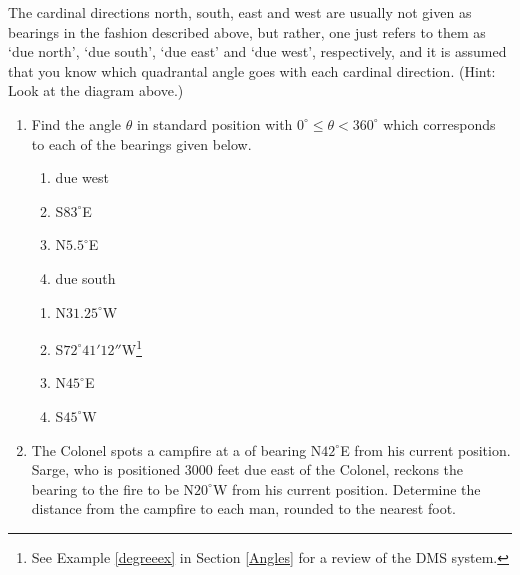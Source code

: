The cardinal directions north, south, east and west are usually not given as bearings in the fashion described above, but rather, one just refers to them as `due north', `due south', `due east' and `due west', respectively, and it is assumed that you know which quadrantal angle goes with each cardinal direction.  (Hint: Look at the diagram above.)  

\begin{enumerate}

\setcounter{enumi}{\value{HW}}

\item Find the angle $\theta$ in standard position with $0^{\circ} \leq \theta < 360^{\circ}$ which corresponds to each of the bearings given below.
\enlargethispage{.25in}
\begin{multicols}{4}

\begin{enumerate}

\item due west
\item S$83^{\circ}$E
\item N$5.5^{\circ}$E
\item due south

\setcounter{HWindent}{\value{enumii}}

\end{enumerate}

\end{multicols}

\begin{multicols}{4} 

\begin{enumerate}

\setcounter{enumii}{\value{HWindent}}

\item N$31.25^{\circ}$W
\item S$72^{\circ}41'12''$W\footnote{See Example \ref{degreeex} in Section \ref{Angles} for a review of the DMS system.}
\item N$45^{\circ}$E
\item S$45^{\circ}$W

\end{enumerate}

\end{multicols}

\item  The Colonel spots a campfire at a of bearing N$42^{\circ}$E from his current position.  Sarge, who is positioned 3000 feet due east of the Colonel, reckons the bearing to the fire to be N$20^{\circ}$W from his current position.  Determine the distance from the campfire to each man, rounded to the nearest foot.


\end{enumerate}
